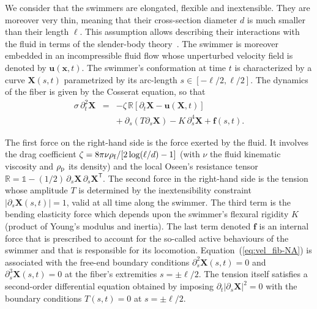 \documentclass[aps,pre,reprint,superscriptaddress]{revtex4-2}
\newcommand{\bX}{\bm X}
\newcommand{\bu}{\bm u}
\newcommand{\bF}{\bm f}
\begin{document}
We consider that the swimmers are elongated, flexible and inextensible. They are moreover very thin, meaning that their cross-section diameter $d$ is much smaller than their length $\ell$. This assumption allows describing their interactions with the fluid in terms of the slender-body theory~\cite{lindner2015elastic}. The swimmer is moreover embedded in an incompressible fluid flow whose unperturbed velocity field is denoted by $\bu(\boldsymbol{x},t)$. The swimmer's conformation at time $t$ is characterized by a curve $\bX(s,t)$ parametrized by its arc-length $s\in[-\ell/2,\ell/2]$. The dynamics of the fiber is given by the Cosserat equation, so that
\begin{eqnarray}
  \sigma\,\partial_t^2\bX  &=& - \zeta\,\mathbb{R}\left[\partial_t \bX-\bu(\bX,t)\right] \nonumber\\
  && +\ \partial_s(T\partial_s \bX) - K\,\partial_s^4 \bX + \bF(s,t).
  \label{eq:vel_fib-NA}
\end{eqnarray}

The first force on the right-hand side is the force exerted by the fluid. It involves the drag coefficient $\zeta = 8\pi\nu\rho_{\rm f}/[2\log(\ell/d)-1]$ (with $\nu$ the fluid kinematic viscosity and $\rho_{\rm p}$ its density) and the local Oseen's resistance tensor $\mathbb{R} = \mathbb{1} -(1/2)\,\partial_s\bX\,\partial_s\bX^{\mathsf{T}}$. The second force in the right-hand side is the tension whose amplitude $T$ is determined by the inextensibility constraint $|\partial_s\bm X(s,t)| = 1$, valid at all time along the swimmer. The third term is the bending elasticity force which depends upon the swimmer's flexural rigidity $K$ (product of Young's modulus and inertia). The last term denoted $\bF$ is an internal force that is prescribed to account for the so-called active behaviours of the swimmer and that is responsible for its locomotion. Equation~(\ref{eq:vel_fib-NA}) is associated with the free-end boundary conditions $\partial_s^2\bX(s,t) = 0$ and $\partial_s^3\bX(s,t) = 0$ at the fiber's extremities $s=\pm\ell/2$. The tension itself satisfies a second-order differential equation obtained by imposing $\partial_t |\partial_s\bX|^2=0$ with the boundary conditions $T(s,t) = 0$ at $s=\pm\ell/2$.
\end{document}
